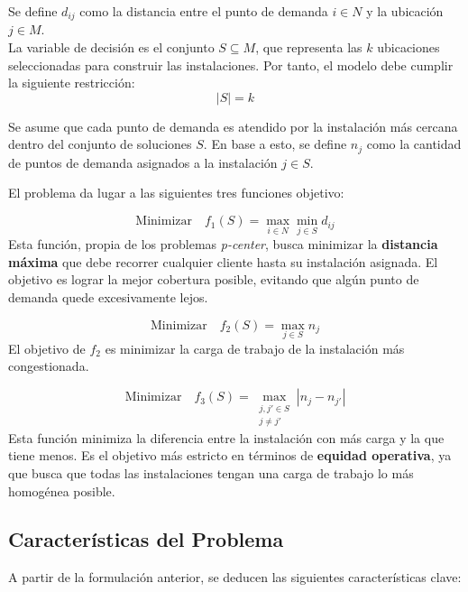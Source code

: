 \documentclass[12pt,a4paper]{book}
\begin{document}
Se define $d_{ij}$ como la distancia entre el punto de demanda $i \in N$ y la ubicación $j \in M$.\\
La variable de decisión es el conjunto $S \subseteq M$, que representa las $k$ ubicaciones seleccionadas para construir las instalaciones. Por tanto, el modelo debe cumplir la siguiente restricción:
\begin{equation}
    |S| = k
\end{equation}

Se asume que cada punto de demanda es atendido por la instalación más cercana dentro del conjunto de soluciones $S$. En base a esto, se define $n_j$ como la cantidad de puntos de demanda asignados a la instalación $j \in S$.

El problema da lugar a las siguientes tres funciones objetivo:

\begin{equation}
    \text{Minimizar} \quad f_1(S) = \max_{i \in N} \min_{j \in S} d_{ij}
\end{equation}
Esta función, propia de los problemas \textit{p-center}, busca minimizar la \textbf{distancia máxima} que debe recorrer cualquier cliente hasta su instalación asignada. El objetivo es lograr la mejor cobertura posible, evitando que algún punto de demanda quede excesivamente lejos.

\begin{equation}
    \text{Minimizar} \quad f_2(S) = \max_{j \in S} n_j
\end{equation}
El objetivo de $f_2$ es minimizar la carga de trabajo de la instalación más congestionada. 

\begin{equation}
    \text{Minimizar} \quad f_3(S) = \max_{\substack{j, j' \in S \\ j \neq j'}} |n_j - n_{j'}|
\end{equation}
Esta función minimiza la diferencia entre la instalación con más carga y la que tiene menos. Es el objetivo más estricto en términos de \textbf{equidad operativa}, ya que busca que todas las instalaciones tengan una carga de trabajo lo más homogénea posible.

\hrulefill

\subsection{Características del Problema}

A partir de la formulación anterior, se deducen las siguientes características clave:
\end{document}

